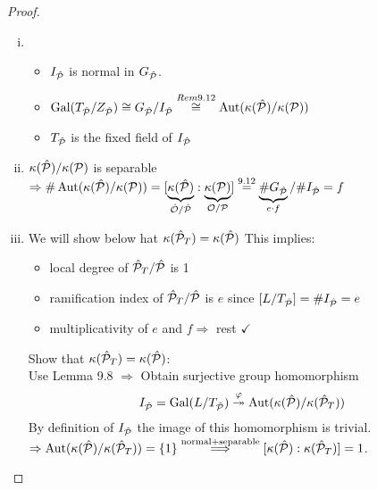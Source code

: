 \begin{proof}
\begin{enumerate}[i)]
\item \begin{itemize}
\item $I_{\hP}$ is normal in $\GP$.
\item $\Gal(T_{\hP} / \ZP) \cong \GP / I_{\hP} \stackrel{Rem 9.12}{\cong} \Aut(\kappa(\hP)/\kappa(\PP))$
\item $T_{\hP}$ is the fixed field of $I_{\hP}$
\end{itemize}
\item $\kappa(\hP)/\kappa(\PP)$ is separable $\Rightarrow \#\Aut(\kappa(\hP)/\kappa(\PP))=[\underbrace{\kappa(\hP)}_{\hO/\hP}:\underbrace{\kappa(\PP)}_{\O/\PP}]\stackrel{\text{9.12}}{=}\underbrace{\#\GP}_{e\cdot f}/\#I_{\hP}=f$
\item We will show below hat $\kappa(\hP_T)=\kappa(\hP)$ This implies:
\begin{itemize}
\item local degree of $\hP_T/\hP$ is 1
\item ramification index of $\hP_T/\hP$ is $e$ since $[L/T_{\hP}]=\#I_{\hP}=e$
\item multiplicativity of $e$ and $f \Rightarrow$ rest $\checkmark$ \\
\end{itemize}
Show that $\kappa(\hP_T)=\kappa(\hP)$:\\
Use Lemma 9.8 $\Rightarrow$ Obtain surjective group homomorphism
\[I_{\hP}=\Gal(L/T_{\hP}) \stackrel{\varphi}{\twoheadrightarrow} \Aut(\kappa(\hP)/\kappa(\hP_T))\]
By definition of $I_{\hP}$ the image of this homomorphism is trivial.\\
$\Rightarrow \Aut(\kappa(\hP)/\kappa(\hP_T))=\{1\} \stackrel{\text{normal+separable}}{\Longrightarrow} [\kappa(\hP):\kappa(\hP_T)]=1$.
\end{enumerate}
\end{proof}
